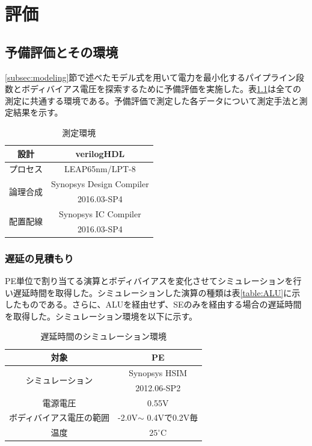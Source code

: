 \chapter{評価}
{
\label{chap:eval}
\section{予備評価とその環境}
\label{sec:measure}
\ref{subsec:modeling}節で述べたモデル式を用いて電力を最小化するパイプライン段数とボディバイアス電圧を探索するために予備評価を実施した。表\ref{table:calc_all}は全ての測定に共通する環境である。予備評価で測定した各データについて測定手法と測定結果を示す。

\begin{table}[h]
\centering
\caption{測定環境}
\label{table:calc_all}
\begin{tabular}{|c|c|} \hline
設計 & verilogHDL \\ \hline
プロセス & LEAP65nm/LPT-8 \\ \hline
\multirow{2}{*}{論理合成} & Synopsys Design Compiler \\
& 2016.03-SP4 \\ \hline
\multirow{2}{*}{配置配線} & Synopsys IC Compiler \\
& 2016.03-SP4 \\ \hline
\end{tabular}
\end{table}

\subsection{遅延の見積もり}
\label{subsec:delay_measure}

PE単位で割り当てる演算とボディバイアスを変化させてシミュレーションを行い遅延時間を取得した。シミュレーションした演算の種類は表\ref{table:ALU}に示したものである。さらに、ALUを経由せず、SEのみを経由する場合の遅延時間を取得した。シミュレーション環境を以下に示す。

\begin{table}[h]
\centering
\caption{遅延時間のシミュレーション環境}
\label{table:calc_delay}
\begin{tabular}{|c|c|} \hline
対象 & PE \\ \hline
\multirow{2}{*}{シミュレーション} & Synopsys HSIM \\
& 2012.06-SP2 \\ \hline
電源電圧 & 0.55V \\ \hline
ボディバイアス電圧の範囲 & -2.0V$\sim$ 0.4Vで0.2V毎 \\ \hline
温度 & $25^\circ$C \\ \hline
\end{tabular}
\end{table}

}

